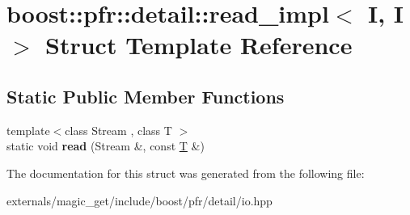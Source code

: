 \hypertarget{structboost_1_1pfr_1_1detail_1_1read__impl_3_01_i_00_01_i_01_4}{}\section{boost\+:\+:pfr\+:\+:detail\+:\+:read\+\_\+impl$<$ I, I $>$ Struct Template Reference}
\label{structboost_1_1pfr_1_1detail_1_1read__impl_3_01_i_00_01_i_01_4}
\subsection*{Static Public Member Functions}
\begin{DoxyCompactItemize}
\item 
\mbox{\label{structboost_1_1pfr_1_1detail_1_1read__impl_3_01_i_00_01_i_01_4_ab8d553fad49378e36562e7a357d81ddb}} 
{\footnotesize template$<$class Stream , class T $>$ }\\static void {\bfseries read} (Stream \&, const \mbox{\hyperlink{struct_t}{T}} \&)
\end{DoxyCompactItemize}


The documentation for this struct was generated from the following file\+:\begin{DoxyCompactItemize}
\item 
externals/magic\+\_\+get/include/boost/pfr/detail/io.\+hpp\end{DoxyCompactItemize}
